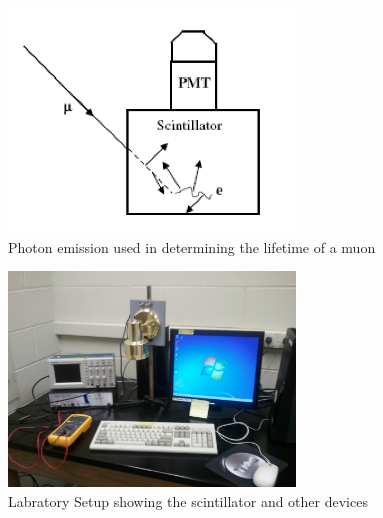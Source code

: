 \documentclass[12pt,twocolumn]{article}
\begin{document}
\begin{figure}[h!]
	\centering
	\label{fig:scin}
	\includegraphics[width=3in]{images/scintillatorevents}
	\caption{Photon emission used in determining the lifetime of a muon}
\end{figure}
\begin{figure}[h!]
	\centering
	\label{fig:scin2}
	\includegraphics[width=3in]{images/Photo}
	\caption{Labratory Setup showing the scintillator and other devices}
\end{figure}
\end{document}
